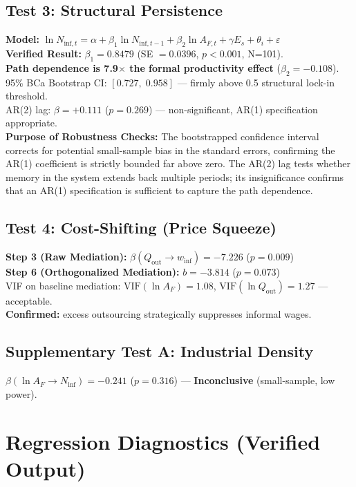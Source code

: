\documentclass[11pt]{article}
\begin{document}
	\subsection{Test 3: Structural Persistence}
	\textbf{Model:} $\ln N_{\text{inf},t} = \alpha + \beta_1 \ln N_{\text{inf},t-1} + \beta_2 \ln A_{F,t} + \gamma E_s + \theta_i + \varepsilon$ \\
	\textbf{Verified Result:} $\beta_1 = 0.8479$ (SE $= 0.0396$, $p<0.001$, N=101). \\
	\textbf{Path dependence is 7.9$\times$ the formal productivity effect} ($\beta_2 = -0.108$). \\
	95\% BCa Bootstrap CI: $[0.727,\; 0.958]$ — firmly above 0.5 structural lock-in threshold. \\
	AR(2) lag: $\beta = +0.111$ ($p=0.269$) — non-significant, AR(1) specification appropriate.\\[4pt]
	\textbf{Purpose of Robustness Checks:} The bootstrapped confidence interval corrects for potential small-sample bias in the standard errors, confirming the AR(1) coefficient is strictly bounded far above zero. The AR(2) lag tests whether memory in the system extends back multiple periods; its insignificance confirms that an AR(1) specification is sufficient to capture the path dependence.
	
	\subsection{Test 4: Cost-Shifting (Price Squeeze)}
	\textbf{Step 3 (Raw Mediation):} $\beta(Q_{\text{out}} \to w_{\text{inf}}) = -7.226$ ($p=0.009$) \\
	\textbf{Step 6 (Orthogonalized Mediation):} $b = -3.814$ ($p=0.073$) \\
	VIF on baseline mediation: $\text{VIF}(\ln A_F) = 1.08$, $\text{VIF}(\ln Q_{\text{out}}) = 1.27$ — acceptable. \\
	\textbf{Confirmed:} excess outsourcing strategically suppresses informal wages.
	
	\subsection{Supplementary Test A: Industrial Density}
	$\beta(\ln A_F \to N_{\text{inf}}) = -0.241$ ($p=0.316$) — \textbf{Inconclusive} (small-sample, low power).
	
	\section{Regression Diagnostics (Verified Output)}
	
\end{document}
